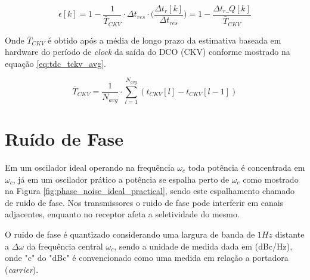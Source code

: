 
 \begin{equation}
	\epsilon [k]= 1 - \frac{1}{\bar T_{CKV}} \cdot \Delta t_{res} \cdot \Bigg ( \frac{\Delta t_r [k]}{ \Delta t_{res}} \Bigg )  = 1 - \frac{\Delta t_r\_Q[k]}{\bar{T}_{CKV}}
	\label{eq:tdc_error_quanti}
\end{equation}

Onde $\bar T_{CKV}$ é obtido após a média de longo prazo da estimativa baseada em hardware do período de \textit{clock} da saída do DCO (CKV) conforme mostrado na equação \ref{eq:tdc_tckv_avg}.

 \begin{equation}
\bar T_{CKV}= \frac{1}{N_{avg}} \cdot \sum_{l=1}^{N_{avg}} ( t_{CKV}[l] - t_{CKV}[l-1])
	\label{eq:tdc_tckv_avg}
\end{equation}

\section{Ruído de Fase}

Em um oscilador ideal operando na frequência $\omega_c$ toda potência é concentrada em $\omega_c$, já em um oscilador prático a potência se espalha perto de $\omega_c$ como mostrado na Figura \ref{fig:phase_noise_ideal_practical}, sendo este espalhamento chamado de ruido de fase. Nos transmissores o ruido de fase pode interferir em canais adjacentes, enquanto no receptor afeta a seletividade do mesmo.

O ruido de fase é quantizado considerando uma largura de banda de $1Hz$ distante a $\Delta \omega$ da frequência central $\omega_c$, sendo a unidade de medida dada em (dBc/Hz), onde "c" do "dBc" é convencionado como uma medida em relação a portadora (\textit{carrier}).

